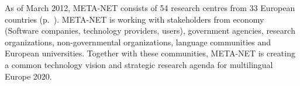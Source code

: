 \begin{Parallel}[c]{78mm}{78mm}
{As of March 2012, META-NET consists of 54 research centres from 33
European countries (p.~\pageref{metanetmembers}). META-NET is working
with stakeholders from economy (Software companies, technology
providers, users), government agencies, research organizations,
non-governmental organizations, language communities and European
universities. Together with these communities, META-NET is creating a
common technology vision and strategic research agenda for
multilingual Europe 2020.}  \ParallelPar
\end{Parallel}

\makefundingnotice



\cleardoublepage


\renewcommand\contentsname{}

\tableofcontents



\cleardoublepage

\setcounter{page}{1}
\pagestyle{scrheadings}


